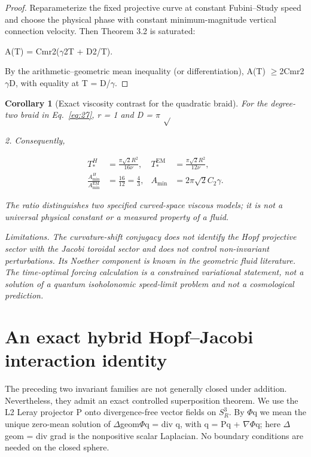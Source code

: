 \documentclass[10pt,letterpaper]{article}
\newtheorem{corollary}[theorem]{Corollary}
\theoremstyle{remark}
\begin{document}
\begin{proof}
Reparameterize the fixed projective curve at constant Fubini–Study speed and choose the physical phase with constant minimum-magnitude vertical connection velocity. Then Theorem 3.2 is saturated:

A(T) = Cmr2(\(\gamma \)2T + D2/T).


By the arithmetic–geometric mean inequality (or differentiation), A(T) \(\ge \)2Cmr2\(\gamma \)D, with equality at T = D/\(\gamma \).


\end{proof}

\begin{corollary}[Exact viscosity contrast for the quadratic braid]

For the degree-two braid in Eq.~\eqref{eq:27}, r = 1 and D = \(\pi \) \(\sqrt{} \)

2. Consequently,



\begin{equation}
\tag{37}\label{eq:37}
\begin{aligned}T_*^H&=\frac{\pi\sqrt2 R^2}{16\nu},&T_*^{\mathrm{EM}}&=\frac{\pi\sqrt2 R^2}{12\nu},\\ \frac{A_{\min}^H}{A_{\min}^{\mathrm{EM}}}&=\frac{16}{12}=\frac43,&A_{\min}&=2\pi\sqrt2 C_2\gamma.\end{aligned}
\end{equation}

The ratio distinguishes two specified curved-space viscous models; it is not a universal physical constant or a measured property of a fluid.


Limitations. The curvature-shift conjugacy does not identify the Hopf projective sector with the Jacobi toroidal sector and does not control non-invariant perturbations. Its Noether component is known in the geometric fluid literature. The time-optimal forcing calculation is a constrained variational statement, not a solution of a quantum isoholonomic speed-limit problem and not a cosmological prediction.


\end{corollary}

\section{An exact hybrid Hopf–Jacobi interaction identity}

The preceding two invariant families are not generally closed under addition. Nevertheless, they admit an exact controlled superposition theorem. We use the L2 Leray projector P onto divergence-free vector fields on \(S_R^3\). By \(\Phi \)q we mean the unique zero-mean solution of \(\Delta \)geom\(\Phi \)q = div q, with q = Pq + \(\nabla \Phi \)q; here \(\Delta \)geom = div grad is the nonpositive scalar Laplacian. No boundary conditions are needed on the closed sphere.
\end{document}
